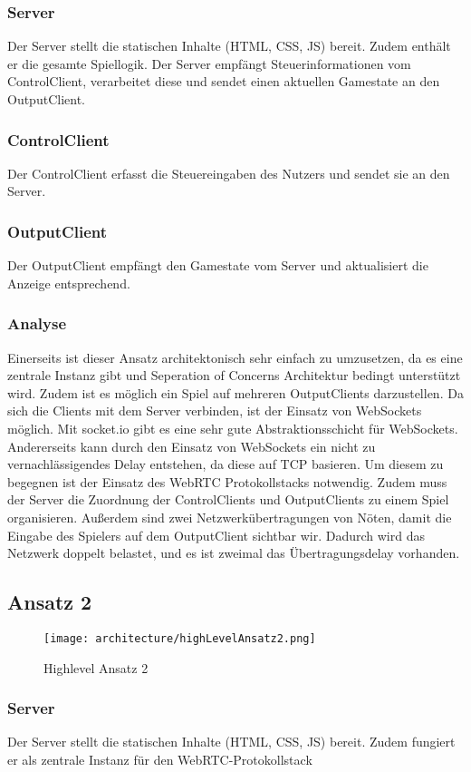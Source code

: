 \subsubsection{Server}
Der Server stellt die statischen Inhalte (HTML, CSS, JS) bereit. Zudem enthält er die gesamte Spiellogik. Der Server empfängt Steuerinformationen vom ControlClient, verarbeitet diese und sendet einen aktuellen Gamestate an den OutputClient.
\subsubsection{ControlClient}
Der ControlClient erfasst die Steuereingaben des Nutzers und sendet sie an den Server.
\subsubsection{OutputClient}
Der OutputClient empfängt den Gamestate vom Server und aktualisiert die Anzeige entsprechend.
\subsubsection{Analyse}
Einerseits ist dieser Ansatz architektonisch sehr einfach zu umzusetzen, da es eine zentrale Instanz gibt und Seperation of Concerns Architektur bedingt unterstützt wird. Zudem ist es möglich ein Spiel auf mehreren OutputClients darzustellen. Da sich die Clients mit dem Server verbinden, ist der Einsatz von WebSockets möglich. Mit socket.io gibt es eine sehr gute Abstraktionsschicht für WebSockets. Andererseits kann durch den Einsatz von WebSockets ein nicht zu vernachlässigendes Delay entstehen, da diese auf TCP basieren. Um diesem zu begegnen ist der Einsatz des WebRTC Protokollstacks notwendig. Zudem muss der Server die Zuordnung der ControlClients und OutputClients zu einem Spiel organisieren. Außerdem sind zwei Netzwerkübertragungen von Nöten, damit die Eingabe des Spielers auf dem OutputClient sichtbar wir. Dadurch wird das Netzwerk doppelt belastet, und es ist zweimal das Übertragungsdelay vorhanden.  
\subsection{Ansatz 2}
\begin{figure}[ht]
	\centering
	\texttt{[image: architecture/highLevelAnsatz2.png]}
	\caption{Highlevel Ansatz 2}
	\label{fig2}
\end{figure}
\subsubsection{Server}
Der Server stellt die statischen Inhalte (HTML, CSS, JS) bereit. Zudem fungiert er als zentrale Instanz für den WebRTC-Protokollstack
